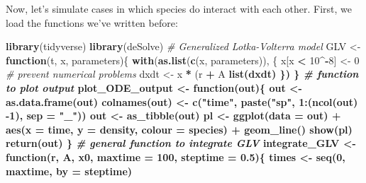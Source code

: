 \documentclass[
]{book}
\newenvironment{Shaded}{\begin{snugshade}}{\end{snugshade}}
\newcommand{\CommentTok}[1]{\textcolor[rgb]{0.56,0.35,0.01}{\textit{#1}}}
\newcommand{\ControlFlowTok}[1]{\textcolor[rgb]{0.13,0.29,0.53}{\textbf{#1}}}
\newcommand{\DataTypeTok}[1]{\textcolor[rgb]{0.13,0.29,0.53}{#1}}
\newcommand{\DecValTok}[1]{\textcolor[rgb]{0.00,0.00,0.81}{#1}}
\newcommand{\FloatTok}[1]{\textcolor[rgb]{0.00,0.00,0.81}{#1}}
\newcommand{\KeywordTok}[1]{\textcolor[rgb]{0.13,0.29,0.53}{\textbf{#1}}}
\newcommand{\NormalTok}[1]{#1}
\newcommand{\OperatorTok}[1]{\textcolor[rgb]{0.81,0.36,0.00}{\textbf{#1}}}
\newcommand{\StringTok}[1]{\textcolor[rgb]{0.31,0.60,0.02}{#1}}
\begin{document}
Now, let's simulate cases in which species do interact with each other. First, we load the functions we've written before:

\begin{Shaded}
\begin{Highlighting}[]
\KeywordTok{library}\NormalTok{(tidyverse)}
\KeywordTok{library}\NormalTok{(deSolve)}
\CommentTok{# Generalized Lotka-Volterra model}
\NormalTok{GLV <-}\StringTok{ }\ControlFlowTok{function}\NormalTok{(t, x, parameters)\{}
  \KeywordTok{with}\NormalTok{(}\KeywordTok{as.list}\NormalTok{(}\KeywordTok{c}\NormalTok{(x, parameters)), \{}
\NormalTok{    x[x }\OperatorTok{<}\StringTok{ }\DecValTok{10}\OperatorTok{^-}\DecValTok{8}\NormalTok{] <-}\StringTok{ }\DecValTok{0} \CommentTok{# prevent numerical problems}
\NormalTok{    dxdt <-}\StringTok{ }\NormalTok{x }\OperatorTok{*}\StringTok{ }\NormalTok{(r }\OperatorTok{+}\StringTok{ }\NormalTok{A }\OperatorTok{%
    \KeywordTok{list}\NormalTok{(dxdt)}
\NormalTok{  \})}
\NormalTok{\}}
\CommentTok{# function to plot output}
\NormalTok{plot_ODE_output <-}\StringTok{ }\ControlFlowTok{function}\NormalTok{(out)\{}
\NormalTok{  out <-}\StringTok{ }\KeywordTok{as.data.frame}\NormalTok{(out)}
  \KeywordTok{colnames}\NormalTok{(out) <-}\StringTok{ }\KeywordTok{c}\NormalTok{(}\StringTok{"time"}\NormalTok{, }\KeywordTok{paste}\NormalTok{(}\StringTok{"sp"}\NormalTok{, }\DecValTok{1}\OperatorTok{:}\NormalTok{(}\KeywordTok{ncol}\NormalTok{(out) }\DecValTok{-1}\NormalTok{), }\DataTypeTok{sep =} \StringTok{"_"}\NormalTok{))}
\NormalTok{  out <-}\StringTok{ }\KeywordTok{as_tibble}\NormalTok{(out) }\OperatorTok{%
\NormalTok{  pl <-}\StringTok{ }\KeywordTok{ggplot}\NormalTok{(}\DataTypeTok{data =}\NormalTok{ out) }\OperatorTok{+}\StringTok{ }
\StringTok{    }\KeywordTok{aes}\NormalTok{(}\DataTypeTok{x =}\NormalTok{ time, }\DataTypeTok{y =}\NormalTok{ density, }\DataTypeTok{colour =}\NormalTok{ species) }\OperatorTok{+}\StringTok{ }
\StringTok{    }\KeywordTok{geom_line}\NormalTok{()}
  \KeywordTok{show}\NormalTok{(pl)}
  \KeywordTok{return}\NormalTok{(out)}
\NormalTok{\}}
\CommentTok{# general function to integrate GLV}
\NormalTok{integrate_GLV <-}\StringTok{ }\ControlFlowTok{function}\NormalTok{(r, A, x0, }\DataTypeTok{maxtime =} \DecValTok{100}\NormalTok{, }\DataTypeTok{steptime =} \FloatTok{0.5}\NormalTok{)\{}
\NormalTok{  times <-}\StringTok{ }\KeywordTok{seq}\NormalTok{(}\DecValTok{0}\NormalTok{, maxtime, }\DataTypeTok{by =}\NormalTok{ steptime)}
}}
\end{Highlighting}
\end{Shaded}
\end{document}
